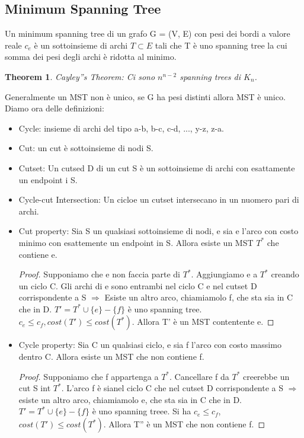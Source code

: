 \documentclass{article}
\newtheorem{theorem}{Theorem}[subsection]
\begin{document}
\subsection{Minimum Spanning Tree}
Un minimum spanning tree di un grafo G = (V, E) con pesi dei bordi a valore reale $c_e$ è un sottoinsieme di archi $T \subset E$ tali che T è uno spanning tree la cui somma dei pesi degli archi è ridotta al minimo.
\begin{theorem}
    Cayley''s Theorem: Ci sono $n^{n-2}$ spanning trees di $K_n$.
\end{theorem}
Generalmente un MST non è unico, se G ha pesi distinti allora MST è unico.
Diamo ora delle definizioni:
\begin{itemize}
    \item Cycle: insieme di archi del tipo a-b, b-c, c-d, ..., y-z, z-a.
    \item Cut: un cut è sottoinsieme di nodi S.
    \item Cutset: Un cutsed D di un cut S è un sottoinsieme di archi con esattamente un endpoint i S.
    \item Cycle-cut Intersection: Un cicloe un cutset intersecano in un nuomero pari di archi.
    \item Cut property: Sia S un qualsiasi sottoinsieme di nodi, e sia e l'arco con costo minimo con esattemente un endpoint in S. Allora esiste un MST $T^*$ che contiene e. 
    \begin{proof}
        Supponiamo che e non faccia parte di $T^*$. Aggiungiamo e a $T^*$ creando un ciclo C. Gli archi di e sono entrambi nel ciclo C e nel cutset D corrispondente a S $\Rightarrow$ Esiste un altro arco, chiamiamolo f, che sta sia in C che in D. $T' = T^*\cup \{e\} - \{f\}$ è uno spanning tree. $c_e \leq c_f, cost(T') \leq cost(T^*)$. Allora T' è un MST contentente e.
    \end{proof}
    \item Cycle property: Sia C un qualsiasi ciclo, e sia f l'arco con costo massimo dentro C. Allora esiste un MST che non contiene f.
    \begin{proof}
        Supponiamo che f appartenga a $T^*$. Cancellare f da $T^*$ creerebbe un cut S int $T^*$.
        L'arco f è sianel ciclo C che nel cutset D corrispondente a S $\Rightarrow$ esiste un altro arco, chiamiamolo e, che sta sia in C che in D. $T'=T^* \cup \{e\}-\{f\} $ è uno spanning treee. Si ha $c_e \leq c_f$, $cost(T')\leq cost (T^*)$. Allora T'' è un MST che non contiene f.
    \end{proof}
\end{itemize}
\end{document}
